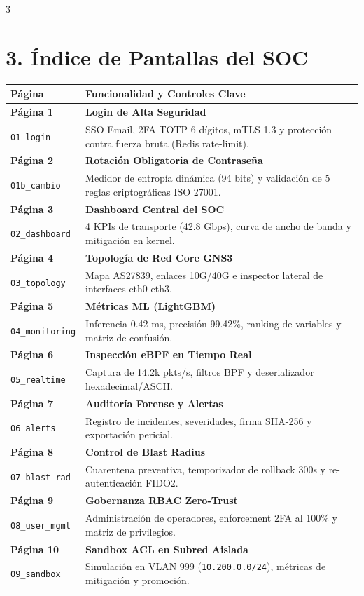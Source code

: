 \documentclass[11pt]{article}
\begin{document}
\begin{multicols}{3}
\columnbreak

\section*{\color{primarydark}\Large 3. Índice de Pantallas del SOC}

\begin{tabularx}{\linewidth}{lX}
\toprule
\textbf{Página} & \textbf{Funcionalidad y Controles Clave} \\
\midrule
\textbf{Página 1} & \textbf{Login de Alta Seguridad}\\[-1bp]
\texttt{01\_login} & SSO Email, 2FA TOTP 6 dígitos, mTLS 1.3 y protección contra fuerza bruta (Redis rate-limit). \\
\midrule
\textbf{Página 2} & \textbf{Rotación Obligatoria de Contraseña}\\[-1bp]
\texttt{01b\_cambio} & Medidor de entropía dinámica (94 bits) y validación de 5 reglas criptográficas ISO 27001. \\
\midrule
\textbf{Página 3} & \textbf{Dashboard Central del SOC}\\[-1bp]
\texttt{02\_dashboard} & 4 KPIs de transporte (42.8 Gbps), curva de ancho de banda y mitigación en kernel. \\
\midrule
\textbf{Página 4} & \textbf{Topología de Red Core GNS3}\\[-1bp]
\texttt{03\_topology} & Mapa AS27839, enlaces 10G/40G e inspector lateral de interfaces eth0-eth3. \\
\midrule
\textbf{Página 5} & \textbf{Métricas ML (LightGBM)}\\[-1bp]
\texttt{04\_monitoring} & Inferencia 0.42 ms, precisión 99.42\%, ranking de variables y matriz de confusión. \\
\midrule
\textbf{Página 6} & \textbf{Inspección eBPF en Tiempo Real}\\[-1bp]
\texttt{05\_realtime} & Captura de 14.2k pkts/s, filtros BPF y deserializador hexadecimal/ASCII. \\
\midrule
\textbf{Página 7} & \textbf{Auditoría Forense y Alertas}\\[-1bp]
\texttt{06\_alerts} & Registro de incidentes, severidades, firma SHA-256 y exportación pericial. \\
\midrule
\textbf{Página 8} & \textbf{Control de Blast Radius}\\[-1bp]
\texttt{07\_blast\_rad} & Cuarentena preventiva, temporizador de rollback 300s y re-autenticación FIDO2. \\
\midrule
\textbf{Página 9} & \textbf{Gobernanza RBAC Zero-Trust}\\[-1bp]
\texttt{08\_user\_mgmt} & Administración de operadores, enforcement 2FA al 100\% y matriz de privilegios. \\
\midrule
\textbf{Página 10} & \textbf{Sandbox ACL en Subred Aislada}\\[-1bp]
\texttt{09\_sandbox} & Simulación en VLAN 999 (\texttt{10.200.0.0/24}), métricas de mitigación y promoción. \\
\bottomrule
\end{tabularx}


\end{multicols}
\end{document}

